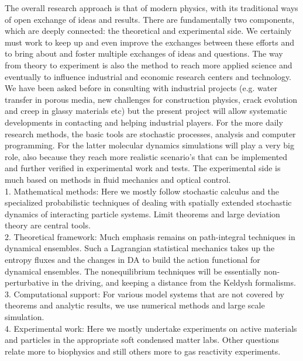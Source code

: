 The overall research approach is that of modern physics, with its traditional ways of open exchange of ideas and results.  There are fundamentally two components, which are deeply connected: the theoretical and experimental side.
We certainly must work to keep up and even improve the exchanges between these efforts and to bring about and foster multiple exchanges of ideas and questions.  The way from theory to experiment is also the method to reach more applied science and eventually to influence industrial and economic research centers and technology.  We have been asked before in consulting with industrial projects (e.g. water transfer in porous media, new challenges for construction physics, crack evolution and creep in glassy materials etc) but the present project will allow systematic developments in contacting and helping industrial players.
For the more daily research methods, the basic tools are stochastic processes, analysis and computer programming.  For the latter molecular dynamics simulations will play a very big role, also because they reach more realistic scenario's that can be implemented and further verified in experimental work and tests.  The experimental side is much based on methods in fluid mechanics and optical control.\\

1. Mathematical methods: Here we mostly follow stochastic calculus and the specialized probabilistic techniques of dealing with spatially extended stochastic dynamics of interacting particle systems. Limit theorems and large deviation theory are central tools.\\
2. Theoretical framework:  Much emphasis remains on path-integral techniques in dynamical ensembles.  Such a Lagrangian statistical mechanics takes up the entropy fluxes and the changes in DA to build the action functional for dynamical ensembles.  The nonequilibrium techniques will be essentially non-perturbative in the driving, and keeping a distance from the Keldysh formalisms.\\
3. Computational support: For various model systems that are not covered by theorems and analytic results, we use numerical methods and large scale simulation.\\
4. Experimental work: Here we mostly undertake experiments on active materials and particles in the appropriate soft condensed matter labs.  Other questions relate more to biophysics and still others more to gas reactivity experiments.\\

